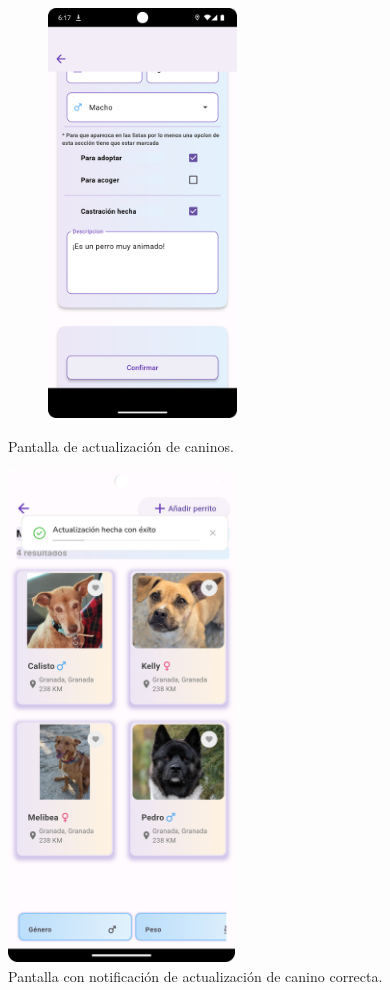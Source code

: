 \documentclass[a4paper, 12pt]{article}
\begin{document}
\begin{figure}[H]
\begin{subfigure}{0.48\textwidth}
\begin{center}
			{\includegraphics[width=5cm]{app/DogUpdate2.png}\par}

		\end{center}  
	\end{subfigure}\hfill
	\caption{Pantalla de actualización de caninos.}
\end{figure}

\begin{figure}[H]
	\begin{center}
		{\includegraphics[width=6cm]{app/DogUpdateSuccesss.png}\par}
		\caption{Pantalla con notificación de actualización de canino correcta.}
	\end{center}  
\end{figure}
\end{document}
